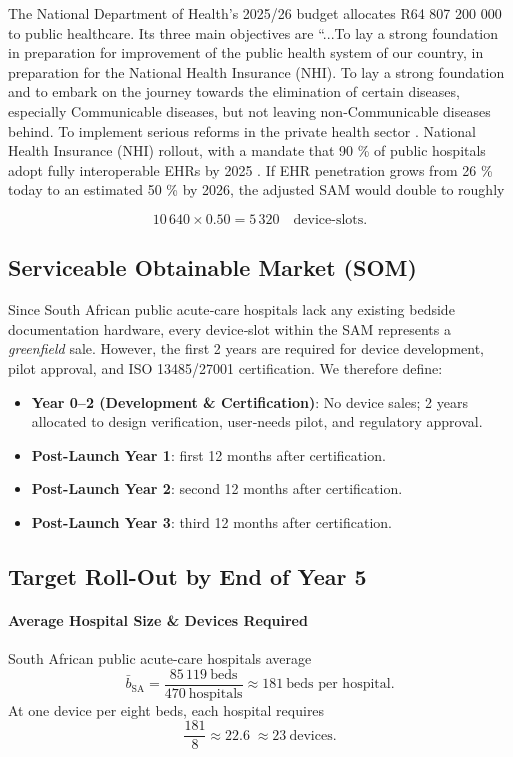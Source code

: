\documentclass[a4paper,11pt]{article}
\begin{document}
The National Department of Health’s 2025/26 budget allocates R64 807 200 000 to public healthcare. Its three main objectives are “...To lay a strong foundation in preparation for improvement of the public health system of our country, in preparation for the National Health Insurance (NHI). To lay a strong foundation and to embark on the journey towards the elimination of certain diseases, especially Communicable diseases, but not leaving non-Communicable diseases behind. To implement serious reforms in the private health sector \cite{MinisterAaronMotsoaledi}.  National Health Insurance (NHI) rollout, with a mandate that 90 \% of public hospitals adopt fully interoperable EHRs by 2025 \cite{DoH_NHI_plan}. If EHR penetration grows from 26 \% today to an estimated 50 \% by 2026, the adjusted SAM would double to roughly

\[
  10\,640 \times 0.50 = 5\,320
  \quad\text{device-slots.}
\]


\subsection{Serviceable Obtainable Market (SOM)}

Since South African public acute‐care hospitals lack any existing bedside documentation hardware, every device‐slot within the SAM represents a \emph{greenfield} sale.  However, the first 2 years are required for device development, pilot approval, and ISO 13485/27001 certification.  We therefore define:

\begin{itemize}
  \item \textbf{Year 0–2 (Development \& Certification)}: No device sales; 2 years allocated to design verification, user‐needs pilot, and regulatory approval.
  \item \textbf{Post-Launch Year 1}: first 12 months after certification.
  \item \textbf{Post-Launch Year 2}: second 12 months after certification.
  \item \textbf{Post-Launch Year 3}: third 12 months after certification.
\end{itemize}

\subsection{Target Roll-Out by End of Year 5}

\paragraph{Average Hospital Size \& Devices Required}%
South African public acute-care hospitals average
\[
  \bar b_{\mathrm{SA}}
  = \frac{85\,119\ \text{beds}}{470\ \text{hospitals}}
  \approx181\ \text{beds per hospital}.
\]
At one device per eight beds, each hospital requires
\[
  \frac{181}{8}
  \approx22.6
  \;\approx23\ \text{devices}.
\]
\end{document}
